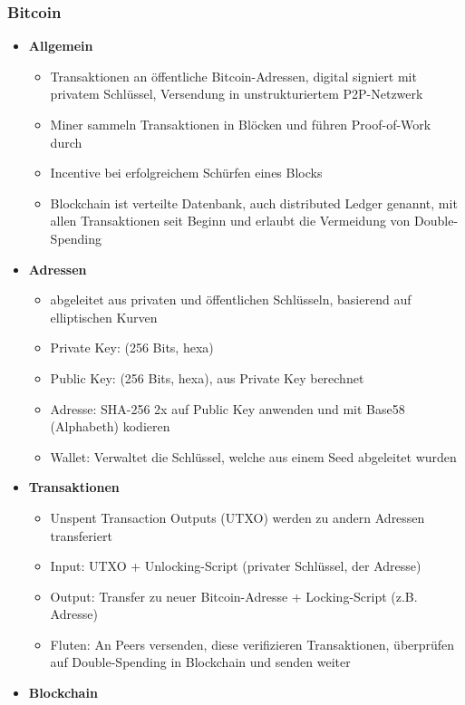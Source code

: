 		\subsubsection{Bitcoin}
			\begin{itemize}
				\item \textbf{Allgemein}
					\begin{itemize}
						\item Transaktionen an öffentliche Bitcoin-Adressen, digital signiert mit privatem Schlüssel, Versendung in unstrukturiertem P2P-Netzwerk
						\item Miner sammeln Transaktionen in Blöcken und führen Proof-of-Work durch
						\item Incentive bei erfolgreichem Schürfen eines Blocks
						\item Blockchain ist verteilte Datenbank, auch distributed Ledger genannt, mit allen Transaktionen seit Beginn und erlaubt die Vermeidung von Double-Spending 
					\end{itemize}
				\item \textbf{Adressen}
					\begin{itemize}
						\item abgeleitet aus privaten und öffentlichen Schlüsseln, basierend auf elliptischen Kurven
						\item Private Key: (256 Bits, hexa)
						\item Public Key: (256 Bits, hexa), aus Private Key berechnet
						\item Adresse: SHA-256 2x auf Public Key anwenden und mit Base58 (Alphabeth) kodieren
						\item Wallet: Verwaltet die Schlüssel, welche aus einem Seed abgeleitet wurden
					\end{itemize}
				\item \textbf{Transaktionen}	
					\begin{itemize}
						\item Unspent Transaction Outputs (UTXO) werden zu andern Adressen transferiert
						\item Input: UTXO + Unlocking-Script (privater Schlüssel, der Adresse)
						\item Output: Transfer zu neuer Bitcoin-Adresse + Locking-Script (z.B. Adresse)
						\item Fluten: An Peers versenden, diese verifizieren Transaktionen, überprüfen auf Double-Spending in Blockchain und senden weiter
					\end{itemize}
				\item \textbf{Blockchain}

\end{itemize}
